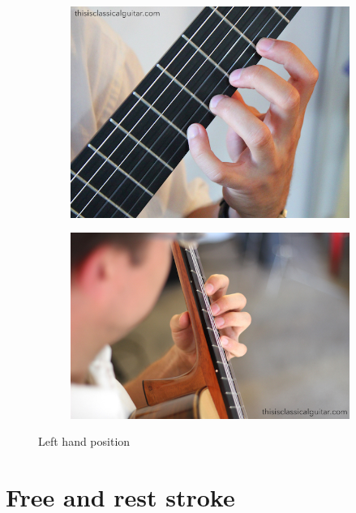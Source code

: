 \begin{figure}[h]
	\begin{subfigure}[b]{0.45\textwidth}
		\includegraphics[width=\textwidth]{../../Images/Brad-left-finger-position-front-2016.jpg}
		\caption{}
		\label{fig:}
	\end{subfigure}
	\hfill
	\begin{subfigure}[b]{0.45\textwidth}
		\includegraphics[width=\textwidth]{../../Images/Bradford-Left-hand-player-2016.jpg}
		\caption{}
		\label{fig:}
	\end{subfigure}
	\caption{Left hand position \cite{LeftHandPositionBradlyWerner}}
	\label{fig:left_hand_position}
\end{figure}

\newpage

\section{Free and rest stroke}

